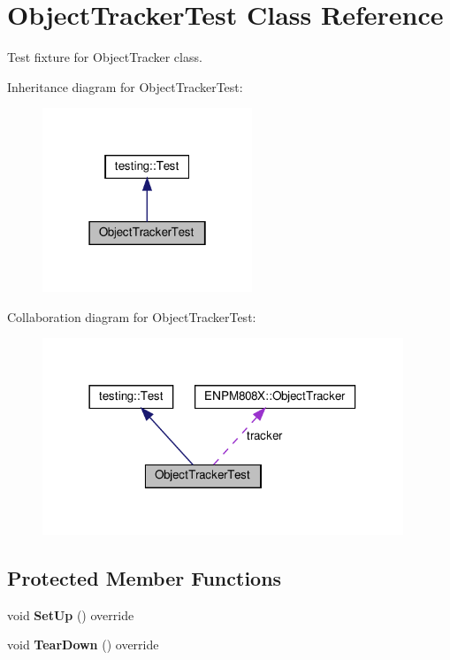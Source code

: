 \hypertarget{class_object_tracker_test}{}\section{Object\+Tracker\+Test Class Reference}
\label{class_object_tracker_test}


Test fixture for Object\+Tracker class.  




Inheritance diagram for Object\+Tracker\+Test\+:
\nopagebreak
\begin{figure}[H]
\begin{center}
\leavevmode
\includegraphics[width=178pt]{class_object_tracker_test__inherit__graph}
\end{center}
\end{figure}


Collaboration diagram for Object\+Tracker\+Test\+:
\nopagebreak
\begin{figure}[H]
\begin{center}
\leavevmode
\includegraphics[width=306pt]{class_object_tracker_test__coll__graph}
\end{center}
\end{figure}
\subsection*{Protected Member Functions}
\begin{DoxyCompactItemize}
\item 
\mbox{\label{class_object_tracker_test_a76621de2cb5ac158a52242e84c2ff604}} 
void {\bfseries Set\+Up} () override
\item 
\mbox{\label{class_object_tracker_test_ac0d78dc8d4552910a2e4795497728977}} 
void {\bfseries Tear\+Down} () override
\end{DoxyCompactItemize}
